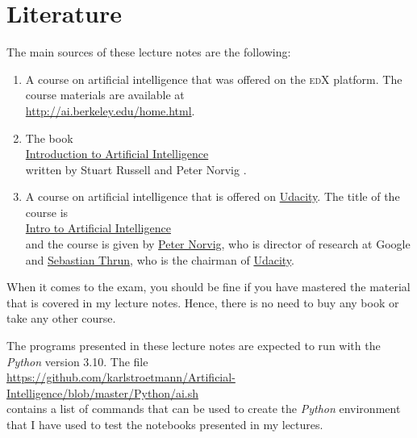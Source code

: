 \section{Literature}
The main sources of these lecture notes are the following:
\begin{enumerate}
\item A course on artificial intelligence that was offered on the \textsc{edX} platform.  The course
      materials are available at  
      \\[0.2cm]
      \hspace*{1.3cm}
      \href{http://ai.berkeley.edu/home.html}{http://ai.berkeley.edu/home.html}.
\item The book
      \\[0.2cm]
      \hspace*{1.3cm}
      \href{https://www.amazon.de/Artificial-Intelligence-Modern-Approach-Global/dp/1292401133/}{Introduction to Artificial Intelligence}
      \\[0.2cm]
      written by Stuart Russell and Peter Norvig \cite{russell:2020}.
\item A course on artificial intelligence that is offered on \href{https://www.udacity.com}{Udacity}.  The title of the
      course is
      \\[0.2cm]
      \hspace*{1.3cm}
      \href{https://www.udacity.com/course/intro-to-artificial-intelligence--cs271}{Intro to Artificial Intelligence}
      \\[0.2cm]
      and the course is given by \href{https://en.wikipedia.org/wiki/Peter_Norvig}{Peter Norvig}, who is
      director of research at Google and \href{https://en.wikipedia.org/wiki/Sebastian_Thrun}{Sebastian Thrun},
      who is the chairman of \href{https://www.udacity.com}{Udacity}.
\end{enumerate}
When it comes to the exam, you should be fine if you have mastered the material that is covered in my
lecture notes.  Hence, there is no need to buy any book or take any other course.

\remark
The programs presented in these lecture notes are expected to run with the \textsl{Python} version 3.10.
The file 
\\[0.2cm]
\hspace*{1.3cm}
\href{https://github.com/karlstroetmann/Artificial-Intelligence/blob/master/Python/ai.sh}{https://github.com/karlstroetmann/Artificial-Intelligence/blob/master/Python/ai.sh}
\\[0.2cm]
contains a list of commands that can be used to create the \textsl{Python} environment that I have used to test
the notebooks presented in my lectures.  

